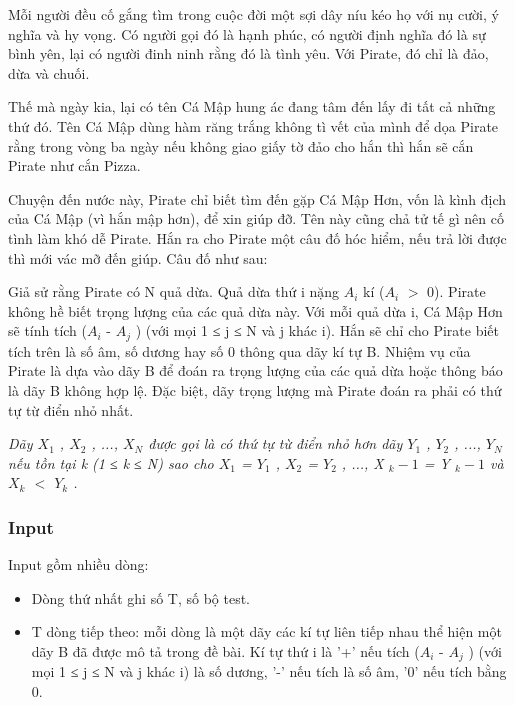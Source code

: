 



   Mỗi người đều cố gắng tìm trong cuộc đời một sợi dây níu kéo họ với nụ cười, ý nghĩa và hy vọng. Có người gọi đó là hạnh phúc, có người định nghĩa đó là sự bình yên, lại có người đinh ninh rằng đó là tình yêu. Với Pirate, đó chỉ là đảo, dừa và chuối.  

   Thế mà ngày kia, lại có tên Cá Mập hung ác đang tâm đến lấy đi tất cả những thứ đó. Tên Cá Mập dùng hàm răng trắng không tì vết của mình để dọa Pirate rằng trong vòng ba ngày nếu không giao giấy tờ đảo cho hắn thì hắn sẽ cắn Pirate như cắn Pizza.  

   Chuyện đến nước này, Pirate chỉ biết tìm đến gặp Cá Mập Hơn, vốn là kình địch của Cá Mập (vì hắn mập hơn), để xin giúp đỡ. Tên này cũng chả tử tế gì nên cố tình làm khó dễ Pirate. Hắn ra cho Pirate một câu đố hóc hiểm, nếu trả lời được thì mới vác mỡ đến giúp. Câu đố như sau:  

   Giả sử rằng Pirate có N quả dừa. Quả dừa thứ i nặng $A_{i}$   kí ($A_{i}$   $>$ 0). Pirate không hề biết trọng lượng của các quả dừa này. Với mỗi quả dừa i, Cá Mập Hơn sẽ tính tích ($A_{i}$   - $A_{j}$   ) (với mọi 1 ≤ j ≤ N và j khác i). Hắn sẽ chỉ cho Pirate biết tích trên là số âm, số dương hay số 0 thông qua dãy kí tự B. Nhiệm vụ của Pirate là dựa vào dãy B để đoán ra trọng lượng của các quả dừa hoặc thông báo là dãy B không hợp lệ. Đặc biệt, dãy trọng lượng mà Pirate đoán ra phải có thứ tự từ điển nhỏ nhất.  

\emph{    Dãy $X_{1}$    , $X_{2}$    , ..., $X_{N}$    được gọi là có thứ tự từ điển nhỏ hơn dãy $Y_{1}$    , $Y_{2}$    , ..., $Y_{N}$    nếu tồn tại k (1 ≤ k ≤ N) sao cho $X_{1}$    = $Y_{1}$    , $X_{2}$    = $Y_{2}$    , ..., X    $_     k - 1    $    = Y    $_     k - 1    $    và $X_{k}$    $<$ $Y_{k}$    .   }

\subsubsection{   Input  }

   Input gồm nhiều dòng:  
\begin{itemize}
	\item     Dòng thứ nhất ghi số T, số bộ test.   
	\item     T dòng tiếp theo: mỗi dòng là một dãy các kí tự liên tiếp nhau thể hiện một dãy B đã được mô tả trong đề bài. Kí tự thứ i là '+' nếu tích ($A_{i}$    - $A_{j}$    ) (với mọi 1 ≤ j ≤ N và j khác i) là số dương, '-' nếu tích là số âm, '0' nếu tích bằng 0.   
\end{itemize}

